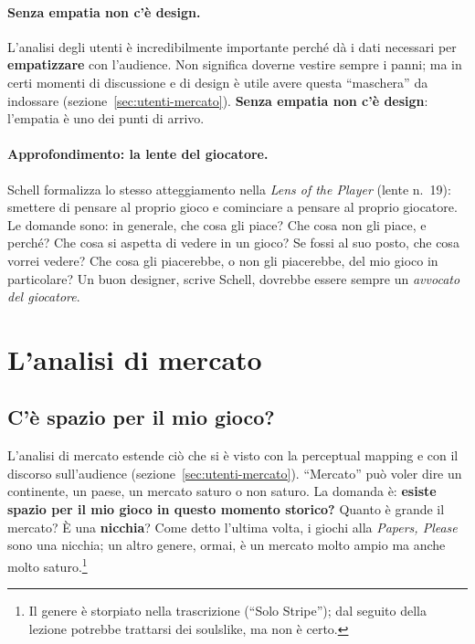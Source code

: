 \paragraph{Senza empatia non c'è design.} L'analisi degli utenti è
incredibilmente importante perché dà i dati necessari per
\textbf{empatizzare} con l'audience. Non significa doverne vestire sempre i
panni; ma in certi momenti di discussione e di design è utile avere questa
``maschera'' da indossare (sezione~\ref{sec:utenti-mercato}).
\textbf{Senza empatia non c'è design}: l'empatia è uno dei punti di arrivo.

\paragraph{Approfondimento: la lente del giocatore.} Schell formalizza lo
stesso atteggiamento nella \emph{Lens of the Player} (lente n.~19): smettere
di pensare al proprio gioco e cominciare a pensare al proprio giocatore. Le
domande sono: in generale, che cosa gli piace? Che cosa non gli piace, e
perché? Che cosa si aspetta di vedere in un gioco? Se fossi al suo posto, che
cosa vorrei vedere? Che cosa gli piacerebbe, o non gli piacerebbe, del mio
gioco in particolare? Un buon designer, scrive Schell, dovrebbe essere sempre
un \emph{avvocato del giocatore}.

\section{L'analisi di mercato}
\label{sec:analisi-mercato}



\subsection{C'è spazio per il mio gioco?}

L'analisi di mercato estende ciò che si è visto con la perceptual mapping e
con il discorso sull'audience (sezione~\ref{sec:utenti-mercato}). ``Mercato''
può voler dire un continente, un paese, un mercato saturo o non saturo. La
domanda è: \textbf{esiste spazio per il mio gioco in questo momento storico?}
Quanto è grande il mercato? È una \textbf{nicchia}? Come detto l'ultima volta,
i giochi alla \emph{Papers, Please} sono una nicchia; un altro genere, ormai,
è un mercato molto ampio ma anche molto saturo.\footnote{Il genere è storpiato
nella trascrizione (``Solo Stripe''); dal seguito della lezione potrebbe
trattarsi dei soulslike, ma non è certo.}

